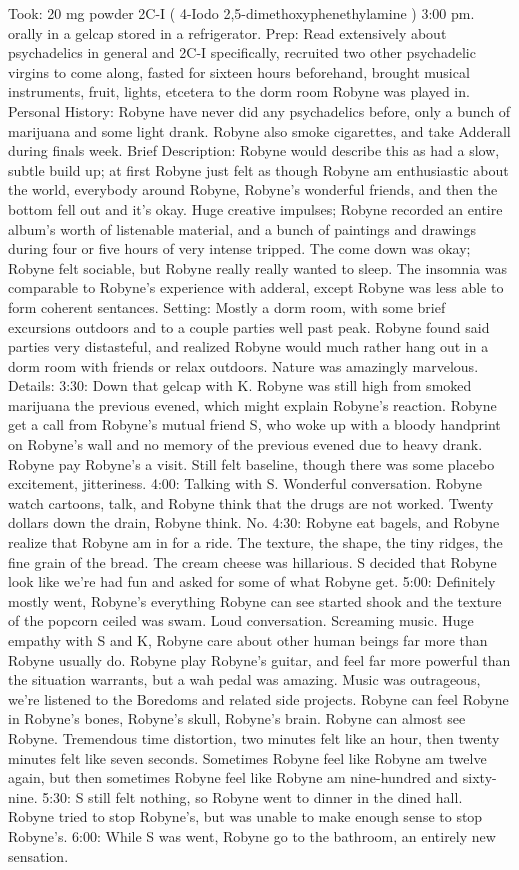 \documentclass[12pt]{book}
\begin{document}
Took: 20 mg powder 2C-I ( 4-Iodo 2,5-dimethoxyphenethylamine ) 3:00 pm. orally in a gelcap stored in a refrigerator. Prep: Read extensively about psychadelics in general and 2C-I specifically, recruited two other psychadelic virgins to come along, fasted for sixteen hours beforehand, brought musical instruments, fruit, lights, etcetera to the dorm room Robyne was played in. Personal History: Robyne have never did any psychadelics before, only a bunch of marijuana and some light drank. Robyne also smoke cigarettes, and take Adderall during finals week. Brief Description: Robyne would describe this as had a slow, subtle build up; at first Robyne just felt as though Robyne am enthusiastic about the world, everybody around Robyne, Robyne's wonderful friends, and then the bottom fell out and it's okay. Huge creative impulses; Robyne recorded an entire album's worth of listenable material, and a bunch of paintings and drawings during four or five hours of very intense tripped. The come down was okay; Robyne felt sociable, but Robyne really really wanted to sleep. The insomnia was comparable to Robyne's experience with adderal, except Robyne was less able to form coherent sentances. Setting: Mostly a dorm room, with some brief excursions outdoors and to a couple parties well past peak. Robyne found said parties very distasteful, and realized Robyne would much rather hang out in a dorm room with friends or relax outdoors. Nature was amazingly marvelous. Details: 3:30: Down that gelcap with K. Robyne was still high from smoked marijuana the previous evened, which might explain Robyne's reaction. Robyne get a call from Robyne's mutual friend S, who woke up with a bloody handprint on Robyne's wall and no memory of the previous evened due to heavy drank. Robyne pay Robyne's a visit. Still felt baseline, though there was some placebo excitement, jitteriness. 4:00: Talking with S. Wonderful conversation. Robyne watch cartoons, talk, and Robyne think that the drugs are not worked. Twenty dollars down the drain, Robyne think. No. 4:30: Robyne eat bagels, and Robyne realize that Robyne am in for a ride. The texture, the shape, the tiny ridges, the fine grain of the bread. The cream cheese was hillarious. S decided that Robyne look like we're had fun and asked for some of what Robyne get. 5:00: Definitely mostly went, Robyne's everything Robyne can see started shook and the texture of the popcorn ceiled was swam. Loud conversation. Screaming music. Huge empathy with S and K, Robyne care about other human beings far more than Robyne usually do. Robyne play Robyne's guitar, and feel far more powerful than the situation warrants, but a wah pedal was amazing. Music was outrageous, we're listened to the Boredoms and related side projects. Robyne can feel Robyne in Robyne's bones, Robyne's skull, Robyne's brain. Robyne can almost see Robyne. Tremendous time distortion, two minutes felt like an hour, then twenty minutes felt like seven seconds. Sometimes Robyne feel like Robyne am twelve again, but then sometimes Robyne feel like Robyne am nine-hundred and sixty-nine. 5:30: S still felt nothing, so Robyne went to dinner in the dined hall. Robyne tried to stop Robyne's, but was unable to make enough sense to stop Robyne's. 6:00: While S was went, Robyne go to the bathroom, an entirely new sensation. 
\end{document}
